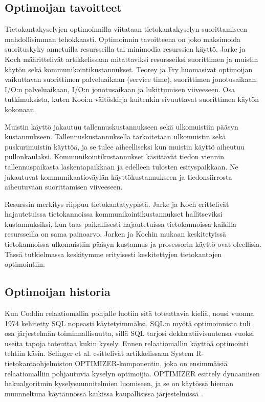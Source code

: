 \documentclass[finnish]{tktltiki2}
\theoremstyle{definition}
\theoremstyle{remark}
\begin{document}

\subsection{Optimoijan tavoitteet}
Tietokantakyselyjen optimoinnilla viitataan tietokantakyselyn suorittamiseen mahdollisimman tehokkaasti. Optimoinnin tavoitteena on joko maksimoida suorituskyky annetuilla resursseilla tai minimodia resurssien käyttö. Jarke ja Koch määrittelivät artikkelissaan \cite{jarke1984} mitattaviksi resursseiksi suorittimen ja muistin käytön sekä kommunikointikustannukset. Teorey ja Fry \cite{teorey1982design} huomasivat optimoijan vaikuttavan suorittimen palveluaikaan (service time), suorittimen jonotusaikaan, I/O:n palveluaikaan, I/O:n jonotusaikaan ja lukittumisen viiveeseen. Osa tutkimuksista, kuten Kooi:n väitöskirja \cite{kooi1980optimization} kuitenkin sivuuttavat suorittimen käytön kokonaan.

Muistin käyttö jakautuu tallennuskustannukseen sekä ulkomuistiin pääsyn kustannukseen. Tallennuskustannuksella tarkoitetaan ulkomuistin sekä puskurimuistin käyttöä, ja se tulee aiheelliseksi kun muistin käyttö aiheutuu pullonkaulaksi. Kommunikointikustannukset käsittävät tiedon viennin tallennuspaikasta laskentapaikkaan ja edelleen tulosten esityspaikkaan. Ne jakautuvat kommunikaatioväylän käyttökustannukseen ja tiedonsiirrosta aiheutuvaan suorittamisen viiveeseen.

Resurssin merkitys riippuu tietokantatyypistä. Jarke ja Koch erittelivät hajautetuissa tietokannoissa kommunikointikustannukset hallitseviksi kustannuksiksi, kun taas paikallisesti hajautetuissa tietokannoissa kaikilla resursseilla on sama painoarvo. Jarken ja Kochin mukaan keskitetyissä tietokannoissa ulkomuistiin pääsyn kustannus ja prosessorin käyttö ovat oleellisia. Tässä tutkielmassa keskitymme erityisesti keskitettyjen tietokantojen optimointiin.

\subsection{Optimoijan historia}
Kun Coddin relaatiomallin pohjalle luotiin sitä toteuttavia kieliä, nousi vuonna 1974 kehitetty SQL nopeasti käytetyimmäksi. SQL:n myötä optimoinnista tuli osa järjestelmän toiminnallisuutta, sillä SQL tarjosi deklaratiivisuutensa vuoksi useita tapoja toteuttaa kukin kysely. Ennen relaatiomallin käyttöä optimointi tehtiin käsin.
Selinger et al. esittelivät artikkelissaan \cite{selinger1979access} System R-tietokantaohjelmiston OPTIMIZER-komponentin, joka on ensimmäisiä relaatiomalliin pohjautuvia kyselyn optimoijia. OPTIMIZER esittely dynaamisen hakualgoritmin kyselysuunnitelmien luomiseen, ja se on käytössä hieman muunneltuna käytännössä kaikissa kaupallisissa järjestelmissä \cite{ioannidis1996query}. 
\end{document}
